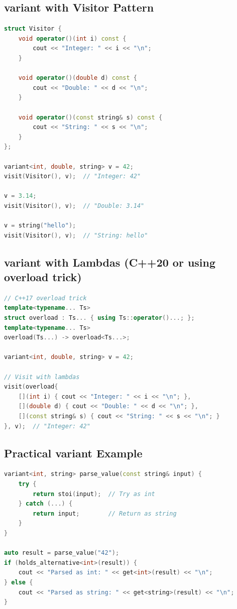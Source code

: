 \hypertarget{variant-with-visitor-pattern}{%
\subsection{variant with Visitor
Pattern}\label{variant-with-visitor-pattern}}

\begin{lstlisting}[language={C++}]
struct Visitor {
    void operator()(int i) const {
        cout << "Integer: " << i << "\n";
    }
    
    void operator()(double d) const {
        cout << "Double: " << d << "\n";
    }
    
    void operator()(const string& s) const {
        cout << "String: " << s << "\n";
    }
};

variant<int, double, string> v = 42;
visit(Visitor(), v);  // "Integer: 42"

v = 3.14;
visit(Visitor(), v);  // "Double: 3.14"

v = string("hello");
visit(Visitor(), v);  // "String: hello"
\end{lstlisting}

\hypertarget{variant-with-lambdas-c20-or-using-overload-trick}{%
\subsection{variant with Lambdas (C++20 or using overload
trick)}\label{variant-with-lambdas-c20-or-using-overload-trick}}

\begin{lstlisting}[language={C++}]
// C++17 overload trick
template<typename... Ts>
struct overload : Ts... { using Ts::operator()...; };
template<typename... Ts>
overload(Ts...) -> overload<Ts...>;

variant<int, double, string> v = 42;

// Visit with lambdas
visit(overload{
    [](int i) { cout << "Integer: " << i << "\n"; },
    [](double d) { cout << "Double: " << d << "\n"; },
    [](const string& s) { cout << "String: " << s << "\n"; }
}, v);  // "Integer: 42"
\end{lstlisting}

\hypertarget{practical-variant-example}{%
\subsection{Practical variant Example}\label{practical-variant-example}}

\begin{lstlisting}[language={C++}]
variant<int, string> parse_value(const string& input) {
    try {
        return stoi(input);  // Try as int
    } catch (...) {
        return input;        // Return as string
    }
}

auto result = parse_value("42");
if (holds_alternative<int>(result)) {
    cout << "Parsed as int: " << get<int>(result) << "\n";
} else {
    cout << "Parsed as string: " << get<string>(result) << "\n";
}
\end{lstlisting}

